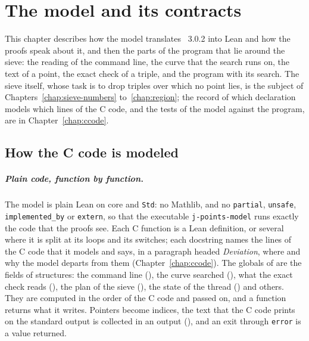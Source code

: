 \chapter{The model and its contracts}\label{chap:model}

This chapter describes how the model translates \jpoints{}~3.0.2 into Lean and how the proofs
speak about it, and then the parts of the program that lie around the sieve: the reading of the
command line, the curve that the search runs on, the text of a point, the exact check of a triple,
and the program with its search. The sieve itself, whose task is to drop triples over which no
point lies, is the subject of Chapters~\ref{chap:sieve-numbers} to~\ref{chap:region}; the record of
which declaration models which lines of the C code, and the tests of the model against the
program, are in Chapter~\ref{chap:ccode}.

\section{How the C code is modeled}\label{sec:modeling}

\paragraph{Plain code, function by function.} The model is plain Lean on core and \texttt{Std}: no
Mathlib, and no \texttt{partial}, \texttt{unsafe}, \texttt{implemented\_by} or \texttt{extern}, so
that the executable \texttt{j-points-model} runs exactly the code that the proofs see. Each C
function is a Lean definition, or several where it is split at its loops and its switches; each
docstring names the lines of the C code that it models and says, in a paragraph headed
\emph{Deviation}, where and why the model departs from them (Chapter~\ref{chap:ccode}). The globals
of \jpoints{} are the fields of structures: the command line (), the curve
searched (), what the exact check reads (),
the plan of the sieve (), the state of the thread ()
and others. They are computed in the order of the C code and passed on, and a function returns
what it writes. Pointers become indices, the text that the C code prints on the standard output is
collected in an output (), and an exit through \texttt{error} is a value
returned.

